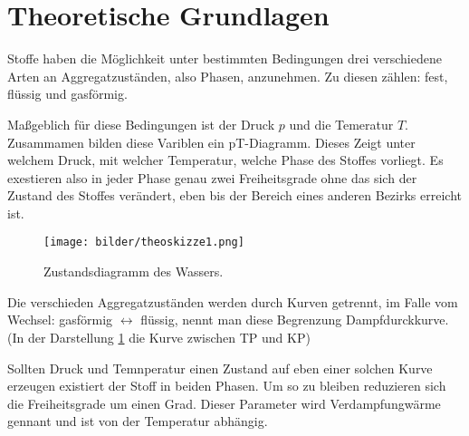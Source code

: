 \section{Theoretische Grundlagen}
Stoffe haben die Möglichkeit unter bestimmten Bedingungen drei verschiedene Arten an Aggregatzuständen, also Phasen, anzunehmen.
Zu diesen zählen: fest, flüssig und gasförmig.

Maßgeblich für diese Bedingungen ist der Druck $p$ und die Temeratur $T$.  Zusammamen bilden diese Variblen
ein pT-Diagramm. Dieses Zeigt unter welchem Druck, mit welcher Temperatur,  welche Phase des Stoffes vorliegt.
Es exestieren also in jeder Phase genau zwei Freiheitsgrade ohne das sich der Zustand des Stoffes verändert, eben bis der Bereich eines anderen Bezirks erreicht ist.

\begin{figure}
    \centering
    \texttt{[image: bilder/theoskizze1.png]}
    \caption{Zustandsdiagramm des Wassers. \cite{skript}} 
    \label{fig:figtheo1}
\end{figure}

Die verschieden Aggregatzuständen werden durch Kurven getrennt, im Falle vom Wechsel: gasförmig $\longleftrightarrow$ flüssig,
nennt man diese Begrenzung Dampfdurckkurve. (In der Darstellung \ref{fig:figtheo1}
die Kurve zwischen TP und KP)

Sollten Druck und Temnperatur einen Zustand auf eben einer solchen Kurve erzeugen existiert der Stoff in beiden Phasen.
Um so zu bleiben reduzieren sich die Freiheitsgrade um einen Grad. Dieser Parameter wird Verdampfungwärme gennant und ist von der Temperatur
abhängig. 


